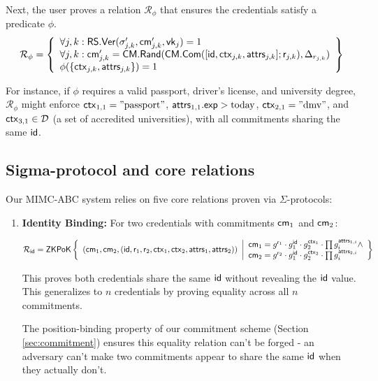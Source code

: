 Next, the user proves a relation $\mathcal{R}_\phi$ that ensures the credentials satisfy a predicate $\phi$. 
\[
\mathcal{R}_\phi = \left\{ 
\begin{array}{l} 
\forall j, k: \mathsf{RS.Ver}(\sigma_{j,k}', \mathsf{cm}_{j,k}', \mathsf{vk}_j) = 1 \\ 
\forall j, k: \mathsf{cm}_{j,k}' = \mathsf{CM.Rand}(\mathsf{CM.Com}([\mathsf{id}, \mathsf{ctx}_{j,k}, \mathsf{attrs}_{j,k}]; \mathsf{r}_{j,k}), \Delta_{r_{j,k}}) \\ 
\phi(\{\mathsf{ctx}_{j,k}, \mathsf{attrs}_{j,k}\}) = 1 
\end{array} 
\right\}
\]

For instance, if $\phi$ requires a valid passport, driver’s license, and university degree, $\mathcal{R}_\phi$ might enforce $\mathsf{ctx}_{1,1} = \text{''passport''}$, $\mathsf{attrs}_{1,1}.\mathsf{exp} > \text{today}$, $\mathsf{ctx}_{2,1} = \text{''dmv''}$, and $\mathsf{ctx}_{3,1} \in \mathcal{D}$ (a set of accredited universities), with all commitments sharing the same $\mathsf{id}$.

\subsection{Sigma-protocol and core relations}

Our MIMC-ABC system relies on five core relations proven via $\Sigma$-protocols:
\begin{enumerate}
  

    \item \textbf{Identity Binding:} For two credentials with commitments $\mathsf{cm}_1$ and $\mathsf{cm}_2$:

    \[
    {\mathcal{R}_{\mathsf{id}}} = {\mathsf{ZKPoK}} \left\{ 
    \begin{array}{l} 
    (\mathsf{cm}_1, \mathsf{cm}_2, (\mathsf{id}, \mathsf{r}_1, \mathsf{r}_2, \mathsf{ctx}_1, \mathsf{ctx}_2, \mathsf{attrs}_1, \mathsf{attrs}_2)) \\
    \end{array} 
    \middle|
    \begin{array}{l}
    \mathsf{cm}_1 = g^{\mathsf{r}_1} \cdot g_1^{\mathsf{id}} \cdot g_2^{\mathsf{ctx}_1} \cdot \prod g_i^{\mathsf{attrs}_{1,i}} \wedge \\
     \mathsf{cm}_2 = g^{\mathsf{r}_2} \cdot g_1^{\mathsf{id}} \cdot g_2^{\mathsf{ctx}_2} \cdot \prod g_i^{\mathsf{attrs}_{2,i}} \\
    \end{array} 
    \right\}
    \]
    
    This proves both credentials share the same $\mathsf{id}$ without revealing the $\mathsf{id}$ value. This generalizes to $n$ credentials by proving equality across all $n$ commitments.
    
    The position-binding property of our commitment scheme (Section \ref{sec:commitment}) ensures this equality relation can't be forged - an adversary can't make two commitments appear to share the same $\mathsf{id}$ when they actually don't.
    
\end{enumerate}


